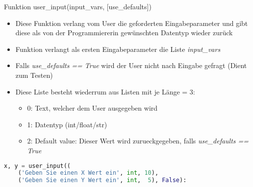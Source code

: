\begin{frame}[fragile]{Funktion user\_input(input\_vars, [use\_defaults])}
  \begin{itemize}
  	\item Diese Funktion verlang vom User die geforderten Eingabeparameter und gibt diese als von der Programmiererin gewünschten Datentyp wieder zurück
    \item Funktion verlangt als ersten Eingabeparameter die Liste \textit{input\_vars}
    \item Falls \textit{use\_defaults == True} wird der User nicht nach Eingabe gefragt (Dient zum Testen)
    \item Diese Liste besteht wiederrum aus Listen mit je Länge = 3:
    \begin{itemize}
    	\item 0: Text, welcher dem User ausgegeben wird
    	\item 1: Datentyp (int/float/str)
    	\item 2: Default value: Dieser Wert wird zurueckgegeben, falls \textit{use\_defaults == True}
    \end{itemize}
  \end{itemize}
  \begin{lstlisting}[language=python]
x, y = user_input((
    ('Geben Sie einen X Wert ein', int, 10),
    ('Geben Sie einen Y Wert ein', int,  5), False):
  \end{lstlisting}
  \logopythonbottom
\end{frame}	